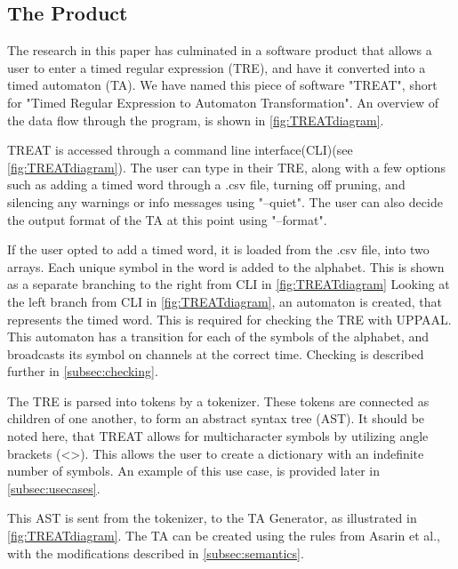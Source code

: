 \subsection{The Product}\label{subsec:theProduct}
The research in this paper has culminated in a software product that allows a user to enter a timed regular expression (TRE), and have it converted into a timed automaton (TA).
We have named this piece of software "TREAT", short for "Timed Regular Expression to Automaton Transformation".
An overview of the data flow through the program, is shown in \cref{fig:TREATdiagram}.



TREAT is accessed through a command line interface(CLI)(see \cref*{fig:TREATdiagram}). The user can type in their TRE, along with a few options such as adding a timed word through a .csv file, turning off pruning, and silencing any warnings or info messages using "--quiet".
The user can also decide the output format of the TA at this point using "--format".

If the user opted to add a timed word, it is loaded from the .csv file, into two arrays. Each unique symbol in the word is added to the alphabet. This is shown as a separate branching to the right from CLI in \cref*{fig:TREATdiagram}
Looking at the left branch from CLI in \cref*{fig:TREATdiagram}, an automaton is created, that represents the timed word. This is required for checking the TRE with UPPAAL. This automaton has a transition for each of the symbols of the alphabet, and broadcasts its symbol on channels at the correct time. Checking is described further in \cref{subsec:checking}.

The TRE is parsed into tokens by a tokenizer. These tokens are connected as children of one another, to form an abstract syntax tree (AST).
It should be noted here, that TREAT allows for multicharacter symbols by utilizing angle brackets (<>). This allows the user to create a dictionary with an indefinite number of symbols. An example of this use case, is provided later in \cref{subsec:usecases}.

This AST is sent from the tokenizer, to the TA Generator, as illustrated in \cref*{fig:TREATdiagram}. The TA can be created using the rules from Asarin et al., with the modifications described in \cref{subsec:semantics}.

